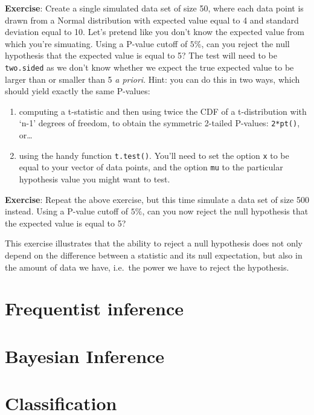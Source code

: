 \documentclass[
]{book}
\begin{document}
\textbf{Exercise}: Create a single simulated data set of size 50, where each data point is drawn from a Normal distribution with expected value equal to 4 and standard deviation equal to 10. Let's pretend like you don't know the expected value from which you're simuating. Using a P-value cutoff of \(5\%\), can you reject the null hypothesis that the expected value is equal to 5? The test will need to be \texttt{two.sided} as we don't know whether we expect the true expected value to be larger than or smaller than 5 \emph{a priori}.
Hint: you can do this in two ways, which should yield exactly the same P-values:

\begin{enumerate}
\def\labelenumi{\arabic{enumi}.}
\item
  computing a t-statistic and then using twice the CDF of a t-distribution with `n-1' degrees of freedom, to obtain the symmetric 2-tailed P-values: \texttt{2*pt()}, or\ldots{}
\item
  using the handy function \texttt{t.test()}. You'll need to set the option \texttt{x} to be equal to your vector of data points, and the option \texttt{mu} to the particular hypothesis value you might want to test.
\end{enumerate}

\textbf{Exercise}: Repeat the above exercise, but this time simulate a data set of size 500 instead. Using a P-value cutoff of \(5\%\), can you now reject the null hypothesis that the expected value is equal to 5?

This exercise illustrates that the ability to reject a null hypothesis does not only depend on the difference between a statistic and its null expectation, but also in the amount of data we have, i.e.~the power we have to reject the hypothesis.

\hypertarget{frequentist-inference}{%
\chapter{Frequentist inference}\label{frequentist-inference}}

\hypertarget{bayesian-inference}{%
\chapter{Bayesian Inference}\label{bayesian-inference}}

\hypertarget{classification}{%
\chapter{Classification}\label{classification}}
\end{document}
